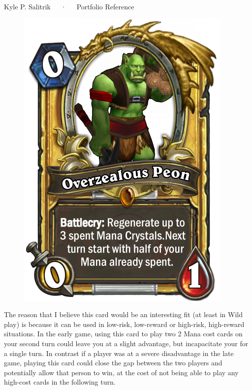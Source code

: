 \documentclass[12pt, a4paper]{awesome-cv}
\begin{document}
\vspace{-1em}
\makecvfooter
  {}
  {Kyle P. Salitrik~~~·~~~Portfolio Reference}
  {}


\begin{cvletter}

\quad 

\begin{figure}[H]
	\centering
	\includegraphics[scale=.6]{card.png}
\end{figure}
The reason that I believe this card would be an interesting fit (at least in Wild play) is because it can be used in low-risk, low-reward or high-risk, high-reward situations. In the early game, using this card to play two 2 Mana cost cards on your second turn could leave you at a slight advantage, but incapacitate your for a single turn. In contrast if a player was at a severe disadvantage in the late game, playing this card could close the gap between the two players and potentially allow that person to win, at the cost of not being able to play any high-cost cards in the following turn.



\end{cvletter}
\end{document}
